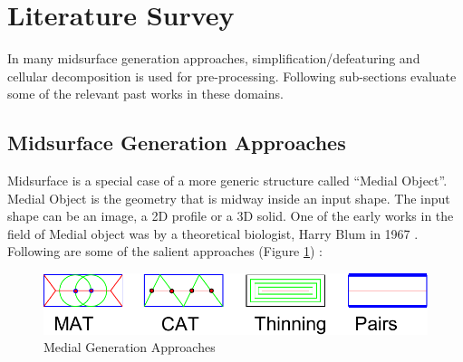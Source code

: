\section{Literature Survey}	

In many midsurface generation approaches, simplification/defeaturing and cellular decomposition is used for pre-processing.  Following sub-sections evaluate some of the relevant past works in these domains.
 
 \subsection{Midsurface Generation Approaches}
 
Midsurface is a special case of a more generic structure called ``Medial Object''. Medial Object is the geometry that is midway inside an input shape. The input shape can be an image, a 2D profile or a 3D solid. One of the early works in the field of Medial object was by a theoretical biologist, Harry Blum in 1967 \cite{Harry1967}. Following are some of the salient approaches  (Figure \ref{fig:medials}) :

\bigskip

	\begin{figure} [!h]
		\centering
		\includegraphics[width=0.7\linewidth]{..//Common/images/MedialMethodsOnlyShort.pdf}
		\caption{Medial Generation Approaches}
		\label{fig:medials}
	\end{figure}


